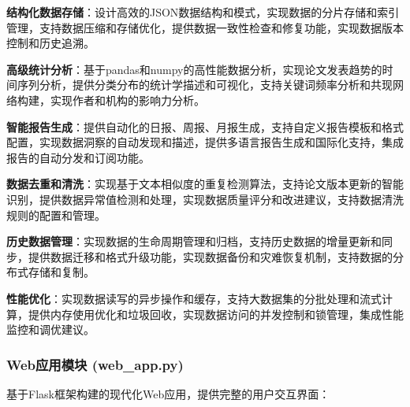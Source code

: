 \documentclass[12pt,a4paper]{article}
\begin{document}
\textbf{结构化数据存储}：设计高效的JSON数据结构和模式，实现数据的分片存储和索引管理，支持数据压缩和存储优化，提供数据一致性检查和修复功能，实现数据版本控制和历史追溯。

\textbf{高级统计分析}：基于pandas和numpy的高性能数据分析，实现论文发表趋势的时间序列分析，提供分类分布的统计学描述和可视化，支持关键词频率分析和共现网络构建，实现作者和机构的影响力分析。

\textbf{智能报告生成}：提供自动化的日报、周报、月报生成，支持自定义报告模板和格式配置，实现数据洞察的自动发现和描述，提供多语言报告生成和国际化支持，集成报告的自动分发和订阅功能。

\textbf{数据去重和清洗}：实现基于文本相似度的重复检测算法，支持论文版本更新的智能识别，提供数据异常值检测和处理，实现数据质量评分和改进建议，支持数据清洗规则的配置和管理。

\textbf{历史数据管理}：实现数据的生命周期管理和归档，支持历史数据的增量更新和同步，提供数据迁移和格式升级功能，实现数据备份和灾难恢复机制，支持数据的分布式存储和复制。

\textbf{性能优化}：实现数据读写的异步操作和缓存，支持大数据集的分批处理和流式计算，提供内存使用优化和垃圾回收，实现数据访问的并发控制和锁管理，集成性能监控和调优建议。

\subsubsection{Web应用模块 (web\_app.py)}
基于Flask框架构建的现代化Web应用，提供完整的用户交互界面：
\end{document}
